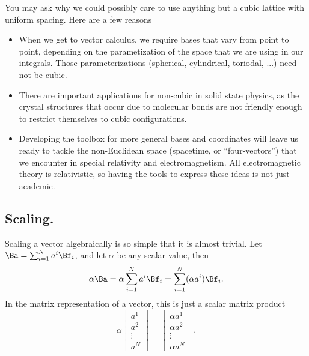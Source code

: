 You may ask why we could possibly care to use anything but a cubic lattice with uniform spacing.
Here are a few reasons
\begin{itemize}
\item When we get to vector calculus, we require bases that vary from point to point, depending on the parametization of the space that we are using in our integrals.
Those parameterizations (spherical, cylindrical, toriodal, ...) need not be cubic.
\item There are important applications for non-cubic in solid state physics, as the crystal structures that occur due to molecular bonds are not friendly enough to restrict themselves to cubic configurations.
\item Developing the toolbox for more general bases and coordinates will leave us ready to tackle the non-Euclidean space (spacetime, or ``four-vectors'') that we encounter in special relativity and electromagnetism.
All electromagnetic theory is relativistic, so having the tools to express these ideas is not just academic.
\end{itemize}
\subsection{Scaling.}
Scaling a vector algebraically is so simple that it is almost trivial.  Let
\( \Ba = \sum_{i = 1}^N a^i \Bf_i \), and let \( \alpha \) be any scalar value, then
\begin{equation}\label{eqn:multivector:240}
\alpha \Ba
=
\alpha \sum_{i = 1}^N a^i \Bf_i
=
\sum_{i = 1}^N (\alpha a^i) \Bf_i.
\end{equation}
In the matrix representation of a vector, this is just a scalar matrix product
\begin{equation}\label{eqn:multivector:260}
\alpha
\begin{bmatrix}
a^1 \\
a^2 \\
\vdots \\
a^N
\end{bmatrix}
=
\begin{bmatrix}
\alpha a^1 \\
\alpha a^2 \\
\vdots \\
\alpha a^N
\end{bmatrix}.
\end{equation}
